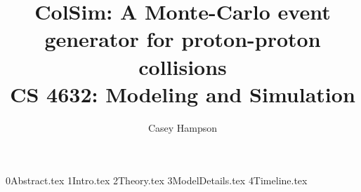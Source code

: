 \documentclass[titlepage]{article}
\title{ColSim: A Monte-Carlo event generator for proton-proton collisions \\[5pt] CS 4632: Modeling and Simulation}
\author{Casey Hampson}
\begin{document}
    \maketitle
    \pagebreak

    {0Abstract.tex}
    {1Intro.tex}
    {2Theory.tex}
    {3ModelDetails.tex}
    {4Timeline.tex}

    \printbibliography
\end{document}
